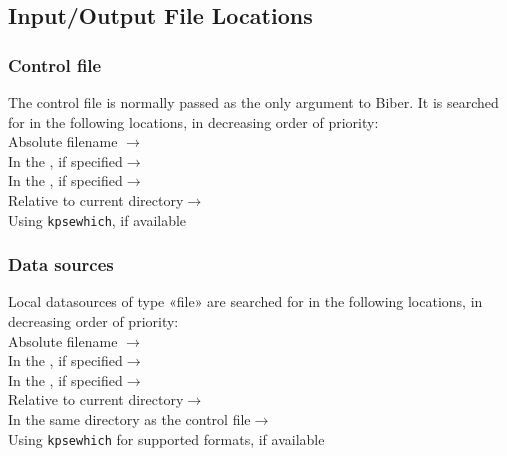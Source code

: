 \documentclass{ltxdockit}
\newcommand*{\biber}{Biber\xspace}
\begin{document}
\subsection{Input/Output File Locations}

\subsubsection{Control file}\label{loc:cf}

The control file is normally passed as the only argument to \biber. It is
searched for in the following locations, in decreasing order of
priority:\\[2ex]

\noindent Absolute filename $\rightarrow$\\
\hspace*{1em}In the , if specified$\rightarrow$\\
\hspace*{2em}In the , if specified$\rightarrow$\\
\hspace*{3em}Relative to current directory$\rightarrow$\\
\hspace*{4em}Using \verb+kpsewhich+, if available

\subsubsection{Data sources}

Local datasources of type «file» are searched for in the following
locations, in decreasing order of priority:\\[2ex]

\noindent Absolute filename $\rightarrow$\\
\hspace*{1em}In the , if specified$\rightarrow$\\
\hspace*{2em}In the , if specified$\rightarrow$\\
\hspace*{3em}Relative to current directory$\rightarrow$\\
\hspace*{4em}In the same directory as the control file$\rightarrow$\\
\hspace*{5em}Using \verb+kpsewhich+ for supported formats, if available\\[2ex]
\end{document}
